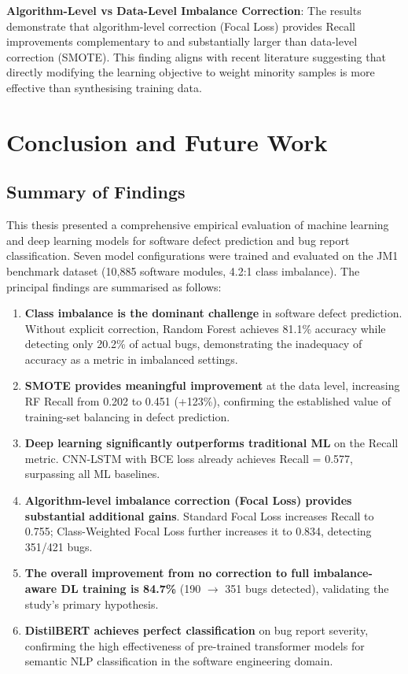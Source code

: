 \documentclass[12pt,a4paper,oneside]{report}
\begin{document}
\textbf{Algorithm-Level vs Data-Level Imbalance Correction}: The results demonstrate that algorithm-level correction (Focal Loss) provides Recall improvements complementary to and substantially larger than data-level correction (SMOTE). This finding aligns with recent literature suggesting that directly modifying the learning objective to weight minority samples is more effective than synthesising training data.

\chapter{Conclusion and Future Work}

\section{Summary of Findings}

This thesis presented a comprehensive empirical evaluation of machine learning and deep learning models for software defect prediction and bug report classification. Seven model configurations were trained and evaluated on the JM1 benchmark dataset (10,885 software modules, 4.2:1 class imbalance). The principal findings are summarised as follows:

\begin{enumerate}
  \item \textbf{Class imbalance is the dominant challenge} in software defect prediction. Without explicit correction, Random Forest achieves 81.1\% accuracy while detecting only 20.2\% of actual bugs, demonstrating the inadequacy of accuracy as a metric in imbalanced settings.

  \item \textbf{SMOTE provides meaningful improvement} at the data level, increasing RF Recall from 0.202 to 0.451 (+123\%), confirming the established value of training-set balancing in defect prediction.

  \item \textbf{Deep learning significantly outperforms traditional ML} on the Recall metric. CNN-LSTM with BCE loss already achieves Recall = 0.577, surpassing all ML baselines.

  \item \textbf{Algorithm-level imbalance correction (Focal Loss) provides substantial additional gains}. Standard Focal Loss increases Recall to 0.755; Class-Weighted Focal Loss further increases it to 0.834, detecting 351/421 bugs.

  \item \textbf{The overall improvement from no correction to full imbalance-aware DL training is 84.7\%} (190 $\rightarrow$ 351 bugs detected), validating the study's primary hypothesis.

  \item \textbf{DistilBERT achieves perfect classification} on bug report severity, confirming the high effectiveness of pre-trained transformer models for semantic NLP classification in the software engineering domain.
\end{enumerate}
\end{document}
